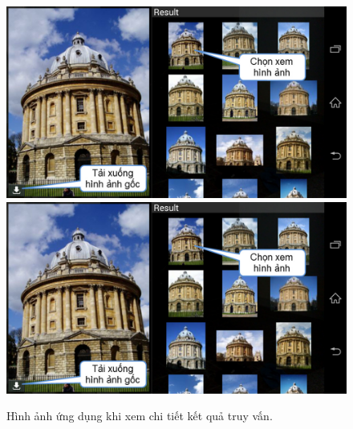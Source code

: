 {\begin{figure}[!htbp]
  \begin{center}
    \leavevmode
    \ifpdf
      \includegraphics[scale=0.17]{interface_4}
    \else
      \includegraphics[scale=0.17]{interface_4}
    \fi
    \caption[Hình ảnh ứng dụng khi xem chi tiết kết quả truy vấn. Người dùng có thể chọn xem một hình ảnh trong danh sách kết quả truy vấn. Ứng dụng sẽ tải hình ảnh chất lượng cao hơn để người dùng dễ dàng xem trong khung hình lớn hơn, nhưng đây chưa phải hình ảnh với chất lượng tốt nhất. Do dó, ứng dụng cũng cho phép người dùng tải hình ảnh gốc chất lượng cao bằng cách chạm vào nút như trên hình.]{Hình ảnh ứng dụng khi xem chi tiết kết quả truy vấn.}
    \label{FigChooseRegion}
  \end{center}
\end{figure}

}
